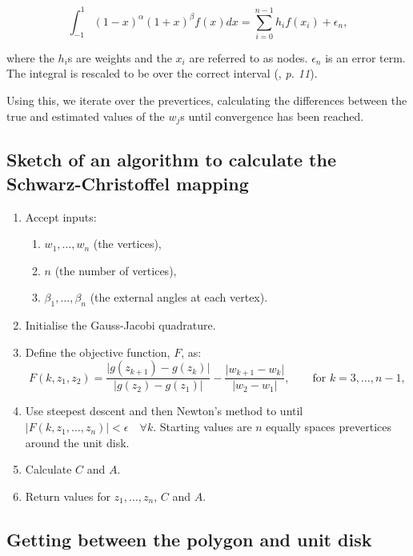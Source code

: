 \documentclass[a4paper,10pt]{amsart}
\newcommand{\sch}{Schwarz-Christoffel }
\begin{document}
\begin{equation}
\int_{-1}^{1} (1-x)^\alpha (1+x)^\beta f(x) dx = \sum_{i=0}^{n-1}h_if(x_i) + \epsilon_n,
\end{equation}

where the $h_i$s are weights and the $x_i$ are referred to as nodes. $\epsilon_n$ is an error term. The integral is rescaled to be over the correct interval (\cite{trefethen}, \emph{p. 11}).

Using this, we iterate over the prevertices, calculating the differences between the true and estimated values of the $w_j$s until convergence has been reached.


\subsection{Sketch of an algorithm to calculate the \sch mapping}

\begin{enumerate}
\item Accept inputs:
   \begin{enumerate} 
      \item $w_1,\dots,w_n$ (the vertices),
      \item $n$ (the number of vertices),
      \item $\beta_1,\dots,\beta_n$ (the external angles at each vertex).
   \end{enumerate}
\item Initialise the Gauss-Jacobi quadrature.
\item Define the objective function, $F$, as:
 \begin{equation*}
 F(k,z_1,z_2) = \frac{\vert g(z_{k+1}) -  g(z_k) \vert}{\vert g(z_2)-g(z_1)\vert} - \frac{\vert w_{k+1} - w_k\vert}{\vert w_2 - w_1\vert}, \qquad \text{for } k=3,\dots,n-1,
 \end{equation*}
\item Use steepest descent and then Newton's method to until $\vert F(k,z_1,\dots,z_n)\vert < \epsilon \quad \forall k$. Starting values are $n$ equally spaces prevertices around the unit disk.
\item Calculate $C$ and $A$.
\item Return values for $z_1,\dots,z_n$, $C$ and $A$.
\end{enumerate}



\subsection{Getting between the polygon and unit disk}
\end{document}
